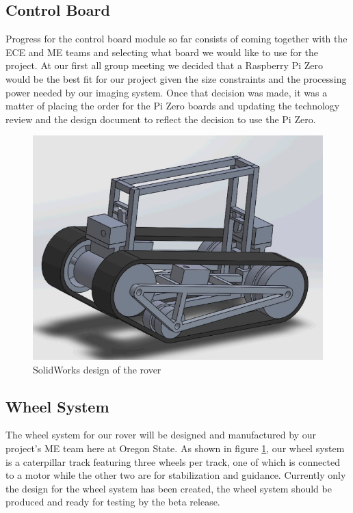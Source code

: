 \documentclass[10pt,letterpaper,onecolumn,draftclsnofoot,journal]{IEEEtran}
\begin{document}
\subsection{Control Board}
Progress for the control board module so far consists of coming together with the ECE and ME teams and selecting what board we would like to use for the project. At our first all group meeting we decided that a Raspberry Pi Zero would be the best fit for our project given the size constraints and the processing power needed by our imaging system. Once that decision was made, it was a matter of placing the order for the Pi Zero boards and updating the technology review and the design document to reflect the decision to use the Pi Zero.
\begin{figure}[h!]
	\includegraphics[scale = .4]{Capture.PNG}
	\caption{SolidWorks design of the rover}
	\label{fig:rover}
\end{figure}
\subsection{Wheel System}
The wheel system for our rover will be designed and manufactured by our project's ME team here at Oregon State. As shown in figure \ref{fig:rover}, our wheel system is a caterpillar track featuring three wheels per track, one of which is connected to a motor while the other two are for stabilization and guidance. Currently only the design for the wheel system has been created, the wheel system should be produced and ready for testing by the beta release.
\end{document}

